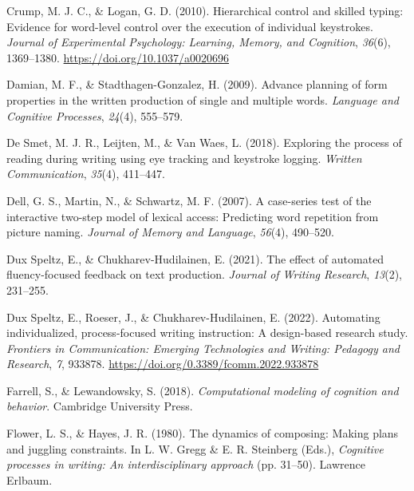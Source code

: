 \documentclass[
  man,floatsintext]{apa7}
\newlength{\cslhangindent}
\newlength{\cslentryspacingunit} %
\newenvironment{CSLReferences}[2] %
 {%
  \setlength{\parindent}{0pt}
  \ifodd #1
  \let\oldpar\par
  \def\par{\hangindent=\cslhangindent\oldpar}
  \fi
  \setlength{\parskip}{#2\cslentryspacingunit}
 }%
 {}
\begin{document}
\begin{CSLReferences}{1}{0}
\leavevmode{}%
Crump, M. J. C., \& Logan, G. D. (2010). Hierarchical control and skilled typing: Evidence for word-level control over the execution of individual keystrokes. \emph{Journal of Experimental Psychology: Learning, Memory, and Cognition}, \emph{36}(6), 1369--1380. \url{https://doi.org/10.1037/a0020696}

\leavevmode{}%
Damian, M. F., \& Stadthagen-Gonzalez, H. (2009). Advance planning of form properties in the written production of single and multiple words. \emph{Language and Cognitive Processes}, \emph{24}(4), 555--579.

\leavevmode{}%
De Smet, M. J. R., Leijten, M., \& Van Waes, L. (2018). Exploring the process of reading during writing using eye tracking and keystroke logging. \emph{Written Communication}, \emph{35}(4), 411--447.

\leavevmode{}%
Dell, G. S., Martin, N., \& Schwartz, M. F. (2007). A case-series test of the interactive two-step model of lexical access: Predicting word repetition from picture naming. \emph{Journal of Memory and Language}, \emph{56}(4), 490--520.

\leavevmode{}%
Dux Speltz, E., \& Chukharev-Hudilainen, E. (2021). The effect of automated fluency-focused feedback on text production. \emph{Journal of Writing Research}, \emph{13}(2), 231--255.

\leavevmode{}%
Dux Speltz, E., Roeser, J., \& Chukharev-Hudilainen, E. (2022). Automating individualized, process-focused writing instruction: A design-based research study. \emph{Frontiers in Communication: Emerging Technologies and Writing: Pedagogy and Research}, \emph{7}, 933878. \url{https://doi.org/0.3389/fcomm.2022.933878}

\leavevmode{}%
Farrell, S., \& Lewandowsky, S. (2018). \emph{Computational modeling of cognition and behavior}. Cambridge University Press.

\leavevmode{}%
Flower, L. S., \& Hayes, J. R. (1980). The dynamics of composing: Making plans and juggling constraints. In L. W. Gregg \& E. R. Steinberg (Eds.), \emph{Cognitive processes in writing: An interdisciplinary approach} (pp. 31--50). Lawrence Erlbaum.


\end{CSLReferences}
\end{document}

